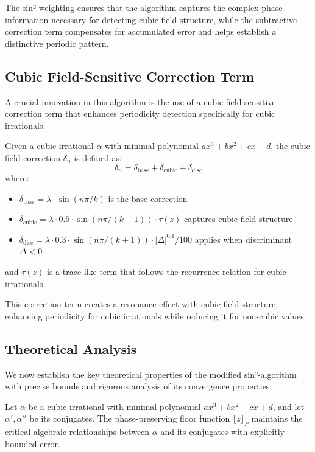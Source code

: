 The sin²-weighting ensures that the algorithm captures the complex phase information necessary for detecting cubic field structure, while the subtractive correction term compensates for accumulated error and helps establish a distinctive periodic pattern.

\subsection{Cubic Field-Sensitive Correction Term}

A crucial innovation in this algorithm is the use of a cubic field-sensitive correction term that enhances periodicity detection specifically for cubic irrationals.

\begin{definition}
Given a cubic irrational $\alpha$ with minimal polynomial $ax^3 + bx^2 + cx + d$, the cubic field correction $\delta_n$ is defined as:
\begin{equation}
\delta_n = \delta_{\text{base}} + \delta_{\text{cubic}} + \delta_{\text{disc}}
\end{equation}
where:
\begin{itemize}
    \item $\delta_{\text{base}} = \lambda \cdot \sin(n\pi/k)$ is the base correction
    \item $\delta_{\text{cubic}} = \lambda \cdot 0.5 \cdot \sin(n\pi/(k-1)) \cdot \tau(z)$ captures cubic field structure
    \item $\delta_{\text{disc}} = \lambda \cdot 0.3 \cdot \sin(n\pi/(k+1)) \cdot |\Delta|^{0.1}/100$ applies when discriminant $\Delta < 0$
\end{itemize}
and $\tau(z)$ is a trace-like term that follows the recurrence relation for cubic irrationals.
\end{definition}

This correction term creates a resonance effect with cubic field structure, enhancing periodicity for cubic irrationals while reducing it for non-cubic values.

\subsection{Theoretical Analysis}

We now establish the key theoretical properties of the modified sin²-algorithm with precise bounds and rigorous analysis of its convergence properties.

\begin{lemma}\label{lem:algebraic_preservation}
Let $\alpha$ be a cubic irrational with minimal polynomial $ax^3 + bx^2 + cx + d$, and let $\alpha', \alpha''$ be its conjugates. The phase-preserving floor function $\lfloor z \rfloor_P$ maintains the critical algebraic relationships between $\alpha$ and its conjugates with explicitly bounded error.
\end{lemma}

